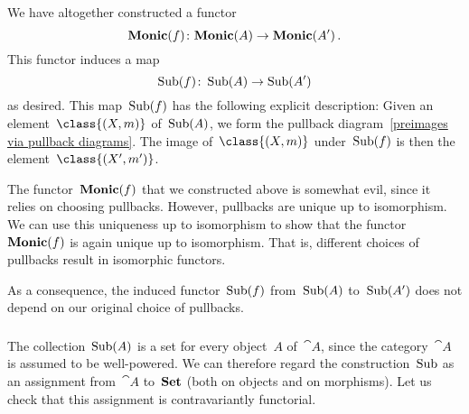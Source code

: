 We have altogether constructed a functor
\[
	\mathbf{Monic}(f) \colon \mathbf{Monic}(A) \to \mathbf{Monic}(A') \,.
\]
This functor induces a map
\[
	\operatorname{Sub}(f) \colon \operatorname{Sub}(A) \to \operatorname{Sub}(A')
\]
as desired.
This map~$\operatorname{Sub}(f)$ has the following explicit description:
Given an element~$\class{(X, m)}$ of~$\operatorname{Sub}(A)$, we form the pullback diagram~\eqref{preimages via pullback diagrams}.
The image of~$\class{(X, m)}$ under~$\operatorname{Sub}(f)$ is then the element~$\class{(X', m')}$.

\begin{remark}
	The functor~$\mathbf{Monic}(f)$ that we constructed above is somewhat evil, since it relies on choosing pullbacks.
	However, pullbacks are unique up to isomorphism.
	We can use this uniqueness up to isomorphism to show that the functor~$\mathbf{Monic}(f)$ is again unique up to isomorphism.
	That is, different choices of pullbacks result in isomorphic functors.

	As a consequence, the induced functor~$\operatorname{Sub}(f)$ from~$\operatorname{Sub}(A)$ to~$\operatorname{Sub}(A')$ does not depend on our original choice of pullbacks.
\end{remark}



\subsubsection{}

The collection~$\operatorname{Sub}(A)$ is a set for every object~$A$ of~$\cat{A}$, since the category~$\cat{A}$ is assumed to be well-powered.
We can therefore regard the construction~$\operatorname{Sub}$ as an assignment from~$\cat{A}$ to~$\mathbf{Set}$ (both on objects and on morphisms).
Let us check that this assignment is contravariantly functorial.

